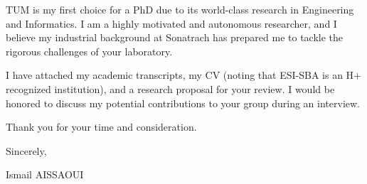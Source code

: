 \documentclass[11pt,a4paper]{article}
\begin{document}
TUM is my first choice for a PhD due to its world-class research in Engineering and Informatics. I am a highly motivated and autonomous researcher, and I believe my industrial background at Sonatrach has prepared me to tackle the rigorous challenges of your laboratory.

I have attached my academic transcripts, my CV (noting that ESI-SBA is an H+ recognized institution), and a research proposal for your review. I would be honored to discuss my potential contributions to your group during an interview.

Thank you for your time and consideration.

Sincerely,

\bigskip

\noindent Ismail AISSAOUI
\end{document}
